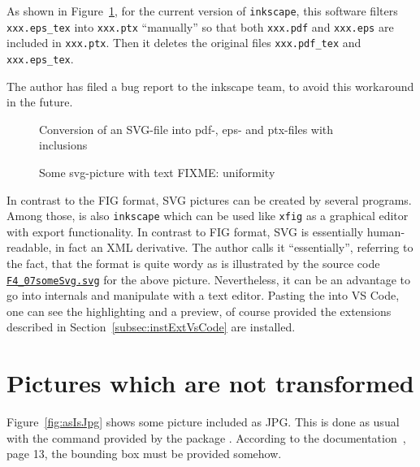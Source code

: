 As shown in Figure~\ref{fig:svg2pdf},
for the current version of \texttt{inkscape},
this software filters \texttt{xxx.eps\_tex} into \texttt{xxx.ptx}
``manually'' so that both \texttt{xxx.pdf} and \texttt{xxx.eps}
are included in \texttt{xxx.ptx}.
Then it deletes the original files
\texttt{xxx.pdf\_tex} and \texttt{xxx.eps\_tex}.

The author has filed a bug report to the inkscape team,
to avoid this workaround in the future. 

\begin{figure}[htb]
\centering
{}
\caption{\label{fig:svg2pdf}Conversion of an SVG-file 
into pdf-, eps- and ptx-files with inclusions}
\end{figure}


\begin{figure}[htb]
\centering
\caption{\label{fig:svgWithText}Some svg-picture with text FIXME\@: uniformity  }
\end{figure}

In contrast to the FIG format, 
SVG pictures can be created by several programs. 
Among those, is also \texttt{inkscape} 
which can be used like \texttt{xfig}  
as a graphical editor with export functionality. 
In contrast to FIG format, 
SVG is essentially human-readable, 
in fact an XML derivative. 
The author calls it ``essentially'', 
referring to the fact, that the format is quite wordy 
as is illustrated by the source code 
\href{\urlSite fromTex/F4_07someSvg.svg}{\texttt{F4\_07someSvg.svg}} 
for the above picture. 
Nevertheless, it can be an advantage 
to go into internals and manipulate with a text editor. 
Pasting the into VS Code, one can see the highlighting and a preview, 
of course provided the extensions 
described in Section~\ref{subsec:instExtVsCode} are installed. 


\section{Pictures which are not transformed}\label{sec:picasis}

Figure~\ref{fig:asIsJpg} shows some picture included as JPG\@. 
This is done as usual with the command 
provided by the package . 
According to the documentation~\cite{GraX}, page 13, 
the bounding box must be provided somehow. 


